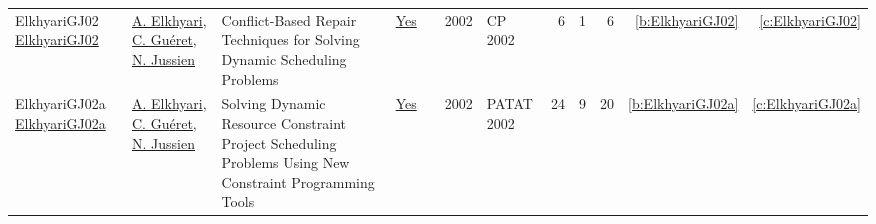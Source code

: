 {\begin{longtable}{>{\raggedright\arraybackslash}p{3cm}>{\raggedright\arraybackslash}p{6cm}>{\raggedright\arraybackslash}p{6.5cm}rrrp{2.5cm}rrrrr}
ElkhyariGJ02 \href{https://doi.org/10.1007/3-540-46135-3\_49}{ElkhyariGJ02} & \hyperref[auth:a295]{A. Elkhyari}, \hyperref[auth:a296]{C. Gu{\'{e}}ret}, \hyperref[auth:a250]{N. Jussien} & Conflict-Based Repair Techniques for Solving Dynamic Scheduling Problems & \href{../works/ElkhyariGJ02.pdf}{Yes} & \cite{ElkhyariGJ02} & 2002 & CP 2002 & 6 & 1 & 6 & \ref{b:ElkhyariGJ02} & \ref{c:ElkhyariGJ02}\\
ElkhyariGJ02a \href{https://doi.org/10.1007/978-3-540-45157-0\_3}{ElkhyariGJ02a} & \hyperref[auth:a295]{A. Elkhyari}, \hyperref[auth:a296]{C. Gu{\'{e}}ret}, \hyperref[auth:a250]{N. Jussien} & Solving Dynamic Resource Constraint Project Scheduling Problems Using New Constraint Programming Tools & \href{../works/ElkhyariGJ02a.pdf}{Yes} & \cite{ElkhyariGJ02a} & 2002 & PATAT 2002 & 24 & 9 & 20 & \ref{b:ElkhyariGJ02a} & \ref{c:ElkhyariGJ02a}\\
\end{longtable}
}

\clearpage
